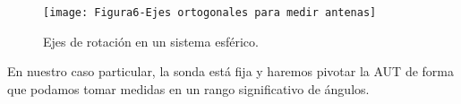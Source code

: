\begin{figure}[h]
    \centering
    \texttt{[image: Figura6-Ejes ortogonales para medir antenas]}
    \caption{Ejes de rotación en un sistema esférico.}
    \label{Ejes-ortogonales-para-medir-antenas}
\end{figure} 

\noindent
En nuestro caso particular, la sonda está fija y haremos pivotar la AUT de forma que podamos tomar medidas en un rango significativo de ángulos.
